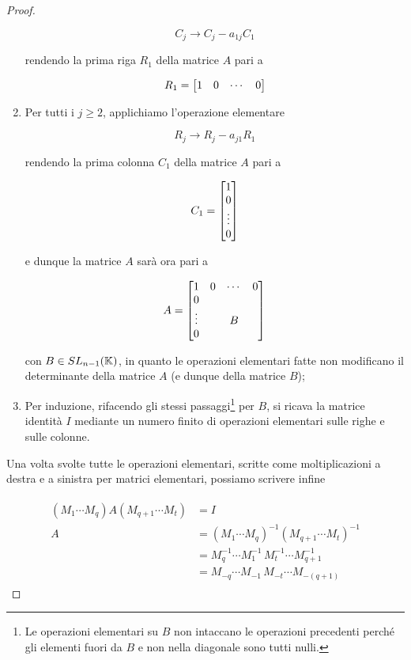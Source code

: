 \begin{proof}
\begin{enumerate}
		\begin{equation}
			C_{j} \to C_{j} - a_{1j} C_{1}
		\end{equation}
	
		rendendo la prima riga $ R_{1} $ della matrice $ A $ pari a 
		
		\begin{equation}
			R_{1} = \bmqty{ 1 & 0 & \cdots & 0 }
		\end{equation}
		
		\item Per tutti i $ j \geqslant 2 $, applichiamo l'operazione elementare
		
		\begin{equation}
			R_{j} \to R_{j} - a_{j1} R_{1}
		\end{equation}
		
		rendendo la prima colonna $ C_{1} $ della matrice $ A $ pari a 
		
		\begin{equation}
			C_{1} = \bmqty{ 1 \\ 0 \\ \vdots \\ 0 }
		\end{equation}
	
		e dunque la matrice $ A $ sarà ora pari a
		
		\begin{equation}
			A = %
			\bmqty{ %
					1 & 0 & \cdots & 0 \\ %
					0 & & & \\ %
					\vdots & & B &\\ %
					0 & & & %
					}
		\end{equation}
	
		con $ B \in SL_{n-1}(\mathbb{K}) $, in quanto le operazioni elementari fatte non modificano il determinante della matrice $ A $ (e dunque della matrice $ B $);
		
		\item Per induzione, rifacendo gli stessi passaggi\footnote{%
			Le operazioni elementari su $ B $ non intaccano le operazioni precedenti perché gli elementi fuori da $ B $ e non nella diagonale sono tutti nulli.%
		} per $ B $, si ricava la matrice identità $ I $ mediante un numero finito di operazioni elementari sulle righe e sulle colonne.
	\end{enumerate}

	Una volta svolte tutte le operazioni elementari, scritte come moltiplicazioni a destra e a sinistra per matrici elementari, possiamo scrivere infine
	
	\begin{align}
		\begin{split}
			(M_{1} \cdots M_{q}) A (M_{q+1} \cdots M_{t}) &= I \\
			A &= (M_{1} \cdots M_{q})^{-1} (M_{q+1} \cdots M_{t})^{-1} \\
			&= M_{q}^{-1} \cdots M_{1}^{-1} \, M_{t}^{-1} \cdots M_{q+1}^{-1} \\
			&= M_{-q} \cdots M_{-1} \, M_{-t} \cdots M_{-(q+1)}
		\end{split}
	\end{align}
\end{proof}

